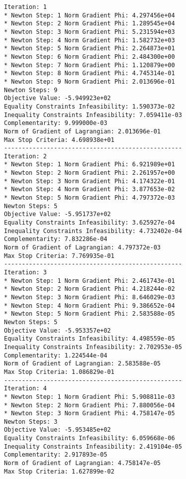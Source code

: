 \documentclass{article}
\begin{document}
\scriptsize
\begin{minipage}[t]{0.45\textwidth}
\begin{verbatim}
Iteration: 1
* Newton Step: 1 Norm Gradient Phi: 4.297456e+04
* Newton Step: 2 Norm Gradient Phi: 1.289545e+04
* Newton Step: 3 Norm Gradient Phi: 5.231594e+03
* Newton Step: 4 Norm Gradient Phi: 1.582732e+03
* Newton Step: 5 Norm Gradient Phi: 2.264873e+01
* Newton Step: 6 Norm Gradient Phi: 2.484300e+00
* Newton Step: 7 Norm Gradient Phi: 1.120879e+00
* Newton Step: 8 Norm Gradient Phi: 4.745314e-01
* Newton Step: 9 Norm Gradient Phi: 2.013696e-01
Newton Steps: 9
Objective Value: -5.949923e+02
Equality Constraints Infeasibility: 1.590373e-02
Inequality Constraints Infeasibility: 7.059411e-03
Complementarity: 9.999000e-03
Norm of Gradient of Lagrangian: 2.013696e-01
Max Stop Criteria: 4.698938e+01
--------------------------------------------------
Iteration: 2
* Newton Step: 1 Norm Gradient Phi: 6.921989e+01
* Newton Step: 2 Norm Gradient Phi: 2.261957e+00
* Newton Step: 3 Norm Gradient Phi: 4.174322e-01
* Newton Step: 4 Norm Gradient Phi: 3.877653e-02
* Newton Step: 5 Norm Gradient Phi: 4.797372e-03
Newton Steps: 5
Objective Value: -5.951737e+02
Equality Constraints Infeasibility: 3.625927e-04
Inequality Constraints Infeasibility: 4.732402e-04
Complementarity: 7.832286e-04
Norm of Gradient of Lagrangian: 4.797372e-03
Max Stop Criteria: 7.769935e-01
--------------------------------------------------
Iteration: 3
* Newton Step: 1 Norm Gradient Phi: 2.461743e-01
* Newton Step: 2 Norm Gradient Phi: 4.218244e-02
* Newton Step: 3 Norm Gradient Phi: 8.646029e-03
* Newton Step: 4 Norm Gradient Phi: 9.386652e-04
* Newton Step: 5 Norm Gradient Phi: 2.583588e-05
Newton Steps: 5
Objective Value: -5.953357e+02
Equality Constraints Infeasibility: 4.498559e-05
Inequality Constraints Infeasibility: 2.702953e-05
Complementarity: 1.224544e-04
Norm of Gradient of Lagrangian: 2.583588e-05
Max Stop Criteria: 1.086829e-01
--------------------------------------------------
Iteration: 4
* Newton Step: 1 Norm Gradient Phi: 5.908811e-03
* Newton Step: 2 Norm Gradient Phi: 7.880056e-04
* Newton Step: 3 Norm Gradient Phi: 4.758147e-05
Newton Steps: 3
Objective Value: -5.953485e+02
Equality Constraints Infeasibility: 6.059668e-06
Inequality Constraints Infeasibility: 2.419104e-05
Complementarity: 2.917893e-05
Norm of Gradient of Lagrangian: 4.758147e-05
Max Stop Criteria: 1.627899e-02
\end{verbatim}
\end{minipage}
\end{document}
